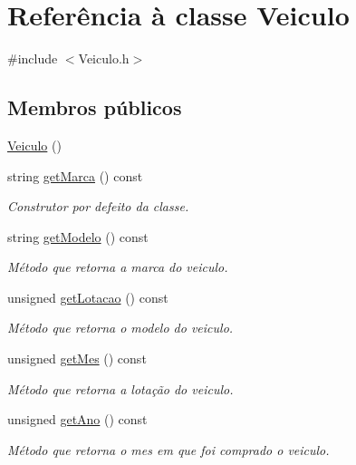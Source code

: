 \hypertarget{class_veiculo}{\section{Referência à classe Veiculo}
\label{class_veiculo}
}


{\ttfamily \#include $<$Veiculo.\+h$>$}

\subsection*{Membros públicos}
\begin{DoxyCompactItemize}
\item 
\hyperlink{class_veiculo_aafab27708a2639bc83a4c3721e57d196}{Veiculo} ()
\item 
string \hyperlink{class_veiculo_a2a9d144f41694ea56a33f20a1c97f80b}{get\+Marca} () const 
\begin{DoxyCompactList}\small\item\em Construtor por defeito da classe. \end{DoxyCompactList}\item 
string \hyperlink{class_veiculo_a96eb5720c0be78eb8ed7023904c6b1be}{get\+Modelo} () const 
\begin{DoxyCompactList}\small\item\em Método que retorna a marca do veiculo. \end{DoxyCompactList}\item 
unsigned \hyperlink{class_veiculo_aaebc59082f462ee46de233311281aef2}{get\+Lotacao} () const 
\begin{DoxyCompactList}\small\item\em Método que retorna o modelo do veiculo. \end{DoxyCompactList}\item 
unsigned \hyperlink{class_veiculo_a9cd8a208e3a1dbf1ba02281f1e97f99c}{get\+Mes} () const 
\begin{DoxyCompactList}\small\item\em Método que retorna a lotação do veiculo. \end{DoxyCompactList}\item 
unsigned \hyperlink{class_veiculo_af86f9122ce46d301c58e6247c641ff7b}{get\+Ano} () const 
\begin{DoxyCompactList}\small\item\em Método que retorna o mes em que foi comprado o veiculo. \end{DoxyCompactList}\item 

\end{DoxyCompactItemize}
